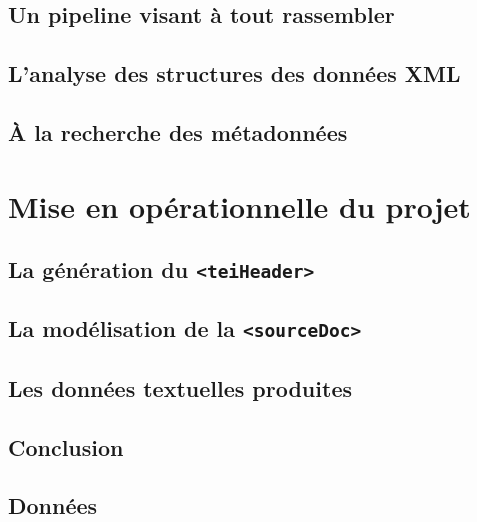 \documentclass[a4paper,12pt,twoside]{book}
\begin{document}
	\chapter{Un pipeline visant à tout rassembler}
	
	
	\chapter{L'analyse des structures des données XML}
	
	
	\chapter{À la recherche des métadonnées}
	
	
	\part{Mise en opérationnelle du projet}
	
	\chapter{La génération du \texttt{<teiHeader>}}
	
	
	\chapter{La modélisation de la \texttt{<sourceDoc>}}
	
	
	\chapter{Les données textuelles produites}
	
	
	\chapter*{Conclusion}
	
	
	
	\appendix
	\chapter{Données}
	
	
	\backmatter


	\printglossaries

	\listoffigures

	\listoftables

	\tableofcontents
	
\end{document}
